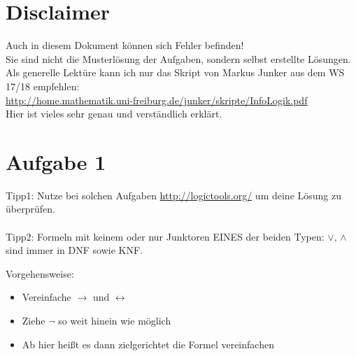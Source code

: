 \documentclass[a4paper]{scrartcl}
\begin{document}
\section*{Disclaimer}%
\label{sec:disclaimer}
Auch in diesem Dokument können sich Fehler befinden!\\
Sie sind nicht die Musterlösung der Aufgaben, sondern selbst erstellte Lösungen.\\

Als generelle Lektüre kann ich nur das Skript von Markus Junker aus dem WS 17/18 empfehlen:\\
\url{http://home.mathematik.uni-freiburg.de/junker/skripte/InfoLogik.pdf}\\
Hier ist vieles sehr genau und verständlich erklärt.

\section*{Aufgabe 1}

Tipp1: Nutze bei solchen Aufgaben \url{http://logictools.org/} um  deine Lösung zu überprüfen.\\\\
Tipp2: Formeln mit keinem oder nur Junktoren EINES der beiden Typen: $\lor$, $\land$ sind immer in DNF sowie KNF.

Vorgehensweise:\\
\begin{itemize}
    \item Vereinfache $\rightarrow$ und $\leftrightarrow$
    \item Ziehe $\neg$ so weit hinein wie möglich
    \item Ab hier heißt es dann zielgerichtet die Formel vereinfachen\\
\end{itemize}
\end{document}
